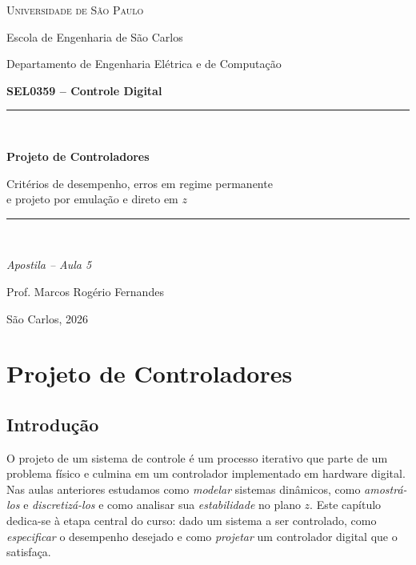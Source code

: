 \documentclass[11pt,a4paper,oneside]{book}
\theoremstyle{definition}
\theoremstyle{plain}
\begin{document}

\frontmatter

\begin{titlepage}
\centering
\vspace*{1.5cm}
{\Large\scshape Universidade de São Paulo\par}
{\large Escola de Engenharia de São Carlos\par}
{\large Departamento de Engenharia Elétrica e de Computação\par}
\vspace{1.2cm}
{\large\bfseries SEL0359 -- Controle Digital\par}
\vspace{2.2cm}
\rule{\linewidth}{0.5pt}\\[0.5cm]
{\Huge\bfseries Projeto de Controladores\par}
\vspace{0.5cm}
{\large Critérios de desempenho, erros em regime permanente\\ e projeto por emulação e direto em $z$\par}
\rule{\linewidth}{0.5pt}\\[0.5cm]
\vspace{1.0cm}
{\large\itshape Apostila -- Aula 5\par}
\vfill
{\large Prof. Marcos Rogério Fernandes\par}
\vspace{0.5cm}
{\normalsize São Carlos, 2026\par}
\end{titlepage}

\tableofcontents
\cleardoublepage

\mainmatter

\chapter{Projeto de Controladores}
\label{cap:projeto}

\section{Introdução}

O projeto de um sistema de controle é um processo iterativo que parte de um
problema físico e culmina em um controlador implementado em hardware digital.
Nas aulas anteriores estudamos como \emph{modelar} sistemas dinâmicos, como
\emph{amostrá-los} e \emph{discretizá-los} e como analisar sua
\emph{estabilidade} no plano $z$. Este capítulo dedica-se à etapa central do
curso: dado um sistema a ser controlado, como \emph{especificar} o desempenho
desejado e como \emph{projetar} um controlador digital que o satisfaça.
\end{document}
